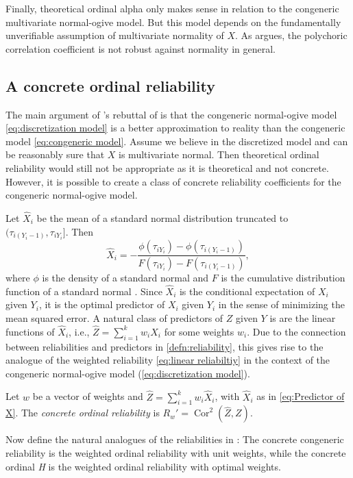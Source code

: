 \documentclass[twoside]{article}
\DeclareMathOperator{\Cor}{Cor}
\begin{document}
Finally, theoretical ordinal alpha only makes sense in relation to
the congeneric multivariate normal-ogive model. But this model depends on
the fundamentally unverifiable assumption of multivariate normality
of $X$. As \citet{Foldnes2019-yd} argues, the polychoric correlation coefficient is not robust against normality in general.

\subsection{A concrete ordinal reliability}

The main argument of \citet{Zumbo2019-lm}'s rebuttal of \citet{Chalmers2018-fj}
is that the congeneric normal-ogive model \eqref{eq:discretization model} 
is a better approximation to reality than the congeneric model \eqref{eq:congeneric model}.
Assume we believe in the discretized model and can be reasonably
sure that $X$ is multivariate normal. Then theoretical ordinal reliability would still
not be appropriate as it is theoretical and not concrete. However,
it is possible to create a class of concrete reliability coefficients for the
congeneric normal-ogive model.

Let $\hat{X}_{i}$ be the mean of a standard normal distribution
truncated to $(\tau_{i(Y_{i}-1)},\tau_{iY_{i}}]$. Then
\begin{equation}
\hat{X}_{i}=-\frac{\phi(\tau_{iY_{i}})-\phi(\tau_{i(Y_{i}-1)})}{F(\tau_{iY_{i}})-F(\tau_{i(Y_{i}-1)})},\label{eq:Predictor of X}
\end{equation}
where $\phi$ is the density of a standard normal and $F$ is the cumulative distribution function of a standard normal \citep[Section 10.1]{Johnson1994-ag}. Since $\hat{X}_{i}$ is the
conditional expectation of $X_{i}$ given $Y_{i}$, it is the optimal
predictor of $X_{i}$ given $Y_{i}$ in the sense of minimizing the
mean squared error. A natural class of predictors of $Z$ given $Y$ is are the linear
functions of $\hat{X}_{i}$, i.e., $\hat{Z} = \sum_{i=1}^{k}w_{i}\hat{X}_{i}$
for some weights $w_{i}$. Due to the connection between reliabilities and predictors in \cref{defn:reliability}, this gives rise to the analogue of the
weighted reliability \eqref{eq:linear reliabiltiy} in the context of the congeneric normal-ogive model
(\ref{eq:discretization model}).
\begin{defn}\label{defn:concrete ordinal reliability}
Let $w$ be a vector of weights and $\hat{Z}=\sum_{i=1}^{k}w_{i}\hat{X}_{i}$, with $\hat{X}_i$ as in \eqref{eq:Predictor of X}. The \textit{concrete ordinal reliability} is $ R_{w}'=\Cor^2(\hat{Z},Z)$.
\end{defn}
Now define the natural analogues of the reliabilities in : The concrete congeneric reliability is the weighted ordinal reliability with unit weights, while the concrete ordinal \textit{H} is the weighted ordinal reliability with optimal weights.  
\end{document}
